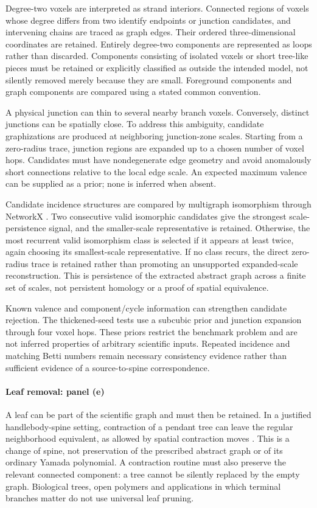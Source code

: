 \documentclass[10pt,twocolumn]{article}
\begin{document}
Degree-two voxels are interpreted as strand interiors. Connected regions of voxels whose degree differs from two identify endpoints or junction candidates, and intervening chains are traced as graph edges. Their ordered three-dimensional coordinates are retained. Entirely degree-two components are represented as loops rather than discarded. Components consisting of isolated voxels or short tree-like pieces must be retained or explicitly classified as outside the intended model, not silently removed merely because they are small. Foreground components and graph components are compared using a stated common convention.

A physical junction can thin to several nearby branch voxels. Conversely, distinct junctions can be spatially close. To address this ambiguity, candidate graphizations are produced at neighboring junction-zone scales. Starting from a zero-radius trace, junction regions are expanded up to a chosen number of voxel hops. Candidates must have nondegenerate edge geometry and avoid anomalously short connections relative to the local edge scale. An expected maximum valence can be supplied as a prior; none is inferred when absent.

Candidate incidence structures are compared by multigraph isomorphism through NetworkX \cite{kg_hagberg2008networkx,kg_cordella2004vf2}. Two consecutive valid isomorphic candidates give the strongest scale-persistence signal, and the smaller-scale representative is retained. Otherwise, the most recurrent valid isomorphism class is selected if it appears at least twice, again choosing its smallest-scale representative. If no class recurs, the direct zero-radius trace is retained rather than promoting an unsupported expanded-scale reconstruction. This is persistence of the extracted abstract graph across a finite set of scales, not persistent homology or a proof of spatial equivalence.

Known valence and component/cycle information can strengthen candidate rejection. The thickened-seed tests use a subcubic prior and junction expansion through four voxel hops. These priors restrict the benchmark problem and are not inferred properties of arbitrary scientific inputs. Repeated incidence and matching Betti numbers remain necessary consistency evidence rather than sufficient evidence of a source-to-spine correspondence.

\paragraph{Leaf removal: panel (e)}
A leaf can be part of the scientific graph and must then be retained. In a justified handlebody-spine setting, contraction of a pendant tree can leave the regular neighborhood equivalent, as allowed by spatial contraction moves \cite{kg_ishii2012handlebody}. This is a change of spine, not preservation of the prescribed abstract graph or of its ordinary Yamada polynomial. A contraction routine must also preserve the relevant connected component: a tree cannot be silently replaced by the empty graph. Biological trees, open polymers and applications in which terminal branches matter do not use universal leaf pruning.
\end{document}
